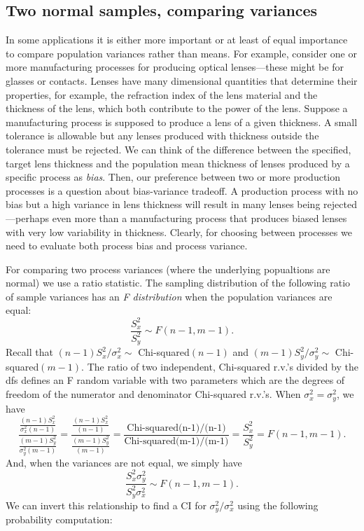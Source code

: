 \documentclass[]{book}
\begin{document}
\subsection{Two normal samples, comparing
variances}\label{two-normal-samples-comparing-variances}

In some applications it is either more important or at least of equal
importance to compare population variances rather than means. For
example, consider one or more manufacturing processes for producing
optical lenses---these might be for glasses or contacts. Lenses have
many dimensional quantities that determine their properties, for
example, the refraction index of the lens material and the thickness of
the lens, which both contribute to the power of the lens. Suppose a
manufacturing process is supposed to produce a lens of a given
thickness. A small tolerance is allowable but any lenses produced with
thickness outside the tolerance must be rejected. We can think of the
difference between the specified, target lens thickness and the
population mean thickness of lenses produced by a specific process as
\emph{bias}. Then, our preference between two or more production
processes is a question about bias-variance tradeoff. A production
process with no bias but a high variance in lens thickness will result
in many lenses being rejected---perhaps even more than a manufacturing
process that produces biased lenses with very low variability in
thickness. Clearly, for choosing between processes we need to evaluate
both process bias and process variance.

For comparing two process variances (where the underlying popualtions
are normal) we use a ratio statistic. The sampling distribution of the
following ratio of sample variances has an \emph{F distribution} when
the population variances are equal:
\[\frac{S_x^2}{S_y^2} \sim F(n-1, m-1).\] Recall that
\((n-1)S_x^2/\sigma_x^2 \sim\) Chi-squared\((n-1)\) and
\((m-1)S_y^2/\sigma_y^2 \sim\) Chi-squared\((m-1)\). The ratio of two
independent, Chi-squared r.v.'s divided by the dfs defines an F random
variable with two parameters which are the degrees of freedom of the
numerator and denominator Chi-squared r.v.'s. When
\(\sigma_x^2 = \sigma_y^2\), we have
\[\frac{\frac{(n-1)S_x^2}{\sigma_x^2(n-1)}}{\frac{(m-1)S_y^2}{\sigma_y^2(m-1)}} = \frac{\frac{(n-1)S_x^2}{(n-1)}}{\frac{(m-1)S_y^2}{(m-1)}} = \frac{\text{Chi-squared(n-1)/(n-1)}}{\text{Chi-squared(m-1)/(m-1)}} = \frac{S_x^2}{S_y^2} =  F(n-1, m-1).\]
And, when the variances are not equal, we simply have
\[\frac{S_x^2 \sigma_y^2}{S_y^2 \sigma_x^2} \sim F(n-1, m-1).\] We can
invert this relationship to find a CI for \(\sigma_y^2 / \sigma_x^2\)
using the following probability computation:
\end{document}
